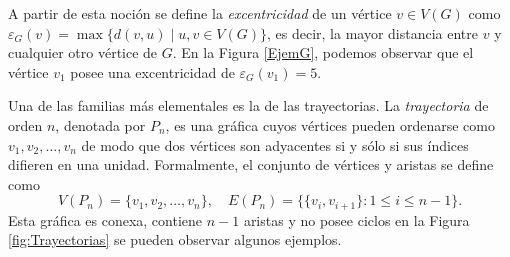 \documentclass[12pt,titlepage,twoside,openright]{book}
\begin{document}
A partir de esta noci\'on se define la \textit{excentricidad} de un v\'ertice $v \in V(G)$ como $\varepsilon_G(v) = \max \{ d(v,u) \mid u,v \in V(G) \}$, es decir, la mayor distancia entre $v$ y cualquier otro v\'ertice de $G$. En la Figura \ref{EjemG}, podemos observar que el v\'ertice $v_1$ posee una excentricidad de $\varepsilon_G(v_1) = 5$. 

Una de las familias m\'as elementales es la de las trayectorias. La \textit{trayectoria} de orden $n$, denotada por $P_n$, es una gr\'afica cuyos v\'ertices pueden ordenarse como $v_1, v_2, \dots, v_n$ de modo que dos v\'ertices son adyacentes si y s\'olo si sus \'indices difieren en una unidad. Formalmente, el conjunto de v\'ertices y aristas se define como $$ V(P_n) = \{v_1, v_2, \dots, v_n\}, \quad E(P_n) = \{\{v_i, v_{i+1}\} : 1 \leq i \leq n-1\}.$$ Esta gr\'afica es conexa, contiene $n-1$ aristas y no posee ciclos en la Figura \ref{fig:Trayectorias} se pueden observar algunos ejemplos.
\end{document}
